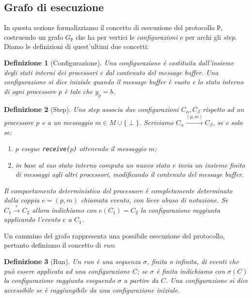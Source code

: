 \documentclass{article}
\newtheorem{definizione}{Definizione}
\begin{document}
\subsection{Grafo di esecuzione}

In questa sezione formalizziamo il concetto di esecuzione del
protocollo $\mathtt{P}$, costruendo un grafo $G_\mathtt{P}$ che ha per vertici le
\emph{configurazioni} e per archi gli \emph{step}. Diamo le
definizioni di quest'ultimi due concetti:

\begin{definizione}[Configurazione]
  Una \emph{configurazione} è costituita dall'insieme degli stati
  interni dei processori e dal contenuto del message buffer. Una
  configurazione si dice \emph{iniziale} quando il message buffer è
  vuoto e lo stato interno di ogni processore $p$ è tale che $y_p =
  b$.
\end{definizione}

\begin{definizione}[Step]
  Uno \emph{step} associa due configurazioni $C_\alpha, C_\beta$
  rispetto ad un processore $p$ e a un messaggio $m \in
  M\cup\{\perp\}$. Scriviamo $C_\alpha\xrightarrow{(p,m)} C_\beta$, se
  e solo se:
  \begin{enumerate}
  \item $p$ esegue \texttt{receive($p$)} ottenendo il messaggio $m$;
  \item in base al suo stato interno computa un nuovo stato e invia un
    insieme finito di messaggi agli altri processori, modificando
     il contenuto del message buffer.
  \end{enumerate} 
  Il comportamento deterministico del processore è completamente
  determinato dalla coppia $e=(p,m)$ chiamata evento, con lieve abuso
  di notazione. Se $C_1 \xrightarrow{e} C_2$ allora indichiamo con
  $e(C_1)=C_2$ la configurazione raggiunta applicando l'evento $e$ a
  $C_1$.
\end{definizione}

Un cammino del grafo rappresenta una possibile esecuzione del
protocollo, pertanto definiamo il concetto di \emph{run}:

\begin{definizione}[Run]
  Un \emph{run} è una sequenza $\sigma$, finita o infinita, di eventi
  che può essere applicata ad una configurazione $C$; se $\sigma$ è
  finita indichiamo con $\sigma(C)$ la configurazione raggiunta
  eseguendo $\sigma$ a partire da $C$. Una configurazione si dice
  \emph{accessibile} se è raggiungibile da una configurazione
  iniziale.
\end{definizione}
\end{document}
